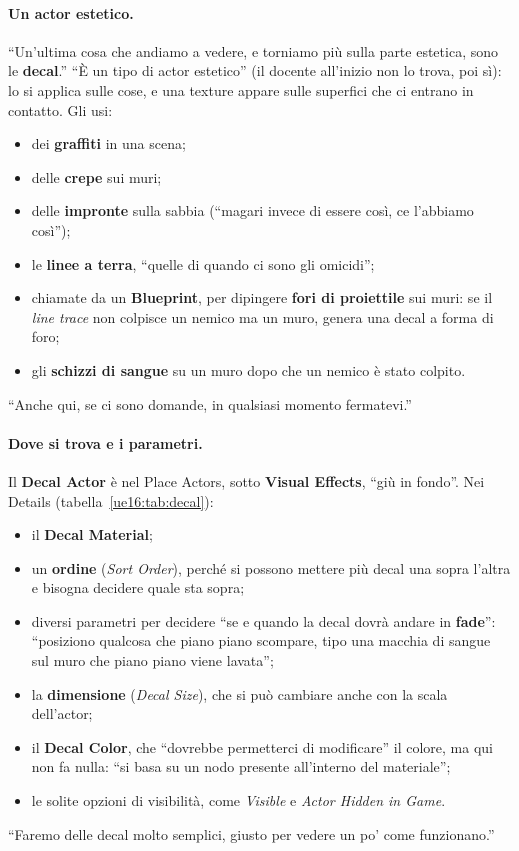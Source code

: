 \paragraph{Un actor estetico.} ``Un'ultima cosa che andiamo a vedere, e torniamo più sulla parte
estetica, sono le \textbf{decal}.'' ``È un tipo di actor estetico'' (il docente all'inizio non lo
trova, poi sì): lo si applica sulle cose, e una texture appare sulle superfici che ci entrano in
contatto. Gli usi:
\begin{itemize}
  \item dei \textbf{graffiti} in una scena;
  \item delle \textbf{crepe} sui muri;
  \item delle \textbf{impronte} sulla sabbia (``magari invece di essere così, ce l'abbiamo
        così'');
  \item le \textbf{linee a terra}, ``quelle di quando ci sono gli omicidi'';
  \item chiamate da un \textbf{Blueprint}, per dipingere \textbf{fori di proiettile} sui muri:
        se il \emph{line trace} non colpisce un nemico ma un muro, genera una decal a forma di
        foro;
  \item gli \textbf{schizzi di sangue} su un muro dopo che un nemico è stato colpito.
\end{itemize}
``Anche qui, se ci sono domande, in qualsiasi momento fermatevi.''

\paragraph{Dove si trova e i parametri.} Il \textbf{Decal Actor} è nel Place Actors, sotto
\textbf{Visual Effects}, ``giù in fondo''. Nei Details (tabella~\ref{ue16:tab:decal}):
\begin{itemize}
  \item il \textbf{Decal Material};
  \item un \textbf{ordine} (\emph{Sort Order}), perché si possono mettere più decal una sopra
        l'altra e bisogna decidere quale sta sopra;
  \item diversi parametri per decidere ``se e quando la decal dovrà andare in \textbf{fade}'':
        ``posiziono qualcosa che piano piano scompare, tipo una macchia di sangue sul muro che
        piano piano viene lavata'';
  \item la \textbf{dimensione} (\emph{Decal Size}), che si può cambiare anche con la scala
        dell'actor;
  \item il \textbf{Decal Color}, che ``dovrebbe permetterci di modificare'' il colore, ma qui non
        fa nulla: ``si basa su un nodo presente all'interno del materiale'';
  \item le solite opzioni di visibilità, come \emph{Visible} e \emph{Actor Hidden in Game}.
\end{itemize}
``Faremo delle decal molto semplici, giusto per vedere un po' come funzionano.''

